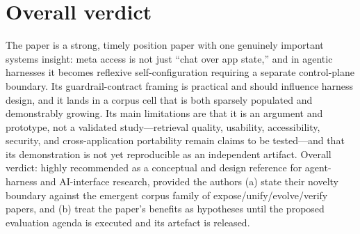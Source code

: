 \documentclass[11pt,a4paper]{article}
\begin{document}
\section{Overall verdict}
The paper is a strong, timely position paper with one genuinely important systems insight: meta access is not just ``chat over app state,'' and in agentic harnesses it becomes reflexive self-configuration requiring a separate control-plane boundary. Its guardrail-contract framing is practical and should influence harness design, and it lands in a corpus cell that is both sparsely populated and demonstrably growing. Its main limitations are that it is an argument and prototype, not a validated study---retrieval quality, usability, accessibility, security, and cross-application portability remain claims to be tested---and that its demonstration is not yet reproducible as an independent artifact. Overall verdict: highly recommended as a conceptual and design reference for agent-harness and AI-interface research, provided the authors (a) state their novelty boundary against the emergent corpus family of expose/unify/evolve/verify papers, and (b) treat the paper's benefits as hypotheses until the proposed evaluation agenda is executed and its artefact is released.
\end{document}
